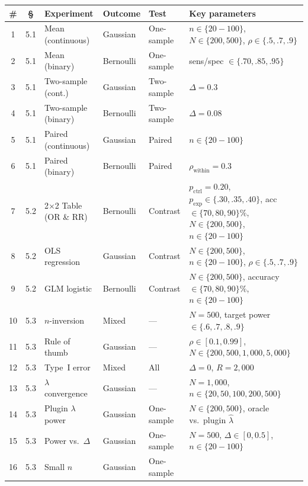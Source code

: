 \iffalse
\begin{table}[!ht]
\centering\footnotesize
\begin{tabular}{@{}cclllp{4.0cm}@{}}
\toprule
\textbf{\#} & \textbf{\S} & \textbf{Experiment} & \textbf{Outcome} &
  \textbf{Test} & \textbf{Key parameters} \\
\midrule
1 & 5.1 & Mean (continuous) & Gaussian & One-sample &
  $n{\in}\{20{-}100\}$, $N{\in}\{200,500\}$,
  $\rho{\in}\{.5,.7,.9\}$ \\
2 & 5.1 & Mean (binary) & Bernoulli & One-sample &
  sens/spec ${\in}\{.70,.85,.95\}$ \\
3 & 5.1 & Two-sample (cont.) & Gaussian & Two-sample &
  $\Delta{=}0.3$ \\
4 & 5.1 & Two-sample (binary) & Bernoulli & Two-sample &
  $\Delta{=}0.08$ \\
5 & 5.1 & Paired (continuous) & Gaussian & Paired &
  $n{\in}\{20{-}100\}$ \\
6 & 5.1 & Paired (binary) & Bernoulli & Paired &
  $\rho_{\text{within}}{=}0.3$ \\
\midrule
7 & 5.2 & 2$\times$2 Table (OR \& RR) & Bernoulli & Contrast &
  $p_{\text{ctrl}}{=}0.20$, $p_{\text{exp}}{\in}\{.30,.35,.40\}$,
  acc${\in}\{70,80,90\}\%$, $N{\in}\{200,500\}$, $n{\in}\{20{-}100\}$ \\
8 & 5.2 & OLS regression & Gaussian & Contrast &
  $N{\in}\{200,500\}$, $n{\in}\{20{-}100\}$, $\rho{\in}\{.5,.7,.9\}$ \\
9 & 5.2 & GLM logistic & Bernoulli & Contrast &
  $N{\in}\{200,500\}$, accuracy${\in}\{70,80,90\}\%$, $n{\in}\{20{-}100\}$ \\
\midrule
10 & 5.3 & $n$-inversion & Mixed & --- &
  $N{=}500$, target power ${\in}\{.6,.7,.8,.9\}$ \\
11 & 5.3 & Rule of thumb & Gaussian & --- &
  $\rho{\in}[0.1,0.99]$, $N{\in}\{200,500,1{,}000,5{,}000\}$ \\
12 & 5.3 & Type~I error & Mixed & All &
  $\Delta{=}0$, $R{=}2{,}000$ \\
13 & 5.3 & $\lambda$ convergence & Gaussian & --- &
  $N{=}1{,}000$, $n{\in}\{20,50,100,200,500\}$ \\
\midrule
14 & 5.3 & Plugin $\lambda$ power & Gaussian & One-sample &
  $N{\in}\{200,500\}$, oracle vs.\ plugin $\hat\lambda$ \\
15 & 5.3 & Power vs.\ $\Delta$ & Gaussian & One-sample &
  $N{=}500$, $\Delta{\in}[0,0.5]$, $n{\in}\{20{-}100\}$ \\
16 & 5.3 & Small $n$ & Gaussian & One-sample &

\end{tabular}
\end{table}
